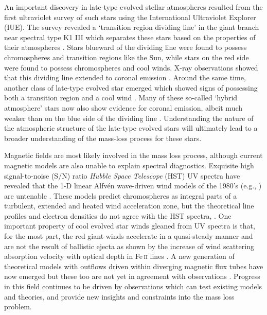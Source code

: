 An important discovery in late-type evolved stellar atmospheres resulted from the first ultraviolet survey of such stars using the International Ultraviolet Explorer (IUE). The survey revealed a `transition region dividing line' in the giant branch near spectral type K1 III which separates these stars based on the properties of their atmospheres \citep{linsky_1979}. Stars blueward of the dividing line were found to possess chromospheres and transition regions like the Sun, while stars on the red side were found to possess chromospheres and cool winds. X-ray observations showed that this dividing line extended to coronal emission \citep{ayres_1981}. Around the same time, another class of late-type evolved star emerged which showed signs of possessing both a transition region and a cool wind \citep[e.g.,][]{reimers_1982}. Many of these so-called `hybrid atmosphere' stars now also show evidence for coronal emission, albeit much weaker than on the blue side of the dividing line \citep{ayres_1997,dupree_2005}. Understanding the nature of the atmospheric structure of the late-type evolved stars will ultimately lead to a broader understanding of the mass-loss process for these stars.

Magnetic fields are most likely involved in the mass loss process, although current magnetic models are also unable to explain spectral diagnostics. Exquisite high signal-to-noise (S/N) ratio \textit{Hubble Space Telescope} (HST) UV spectra have revealed that the 1-D linear Alfv\'en wave-driven wind models of the 1980’s (e.g., \citealt{hartmann_1980,harper_1988}) are untenable \citep{harper_2001}. These models predict chromospheres as integral parts of a turbulent, extended and heated wind acceleration zone, but the theoretical line profiles and electron densities do not agree with the HST spectra, \cite[e.g.,][]{judge_1998}. One important property of cool evolved star winds gleaned from UV spectra is that, for the most part, the red giant winds accelerate in a quasi-steady manner and are not the result of ballistic ejecta as shown by the increase of wind scattering absorption velocity with optical depth in Fe\,\textsc{ii} lines \citep{carpenter_1999}. A new generation of theoretical models with outflows driven within diverging magnetic flux tubes have now emerged \citep{falceta_2006, suzuki_2007} but these too are not yet in agreement with observations \citep{crowley_2009}. Progress in this field continues to be driven by observations which can test existing models and theories, and provide new insights and constraints into the mass loss problem.

